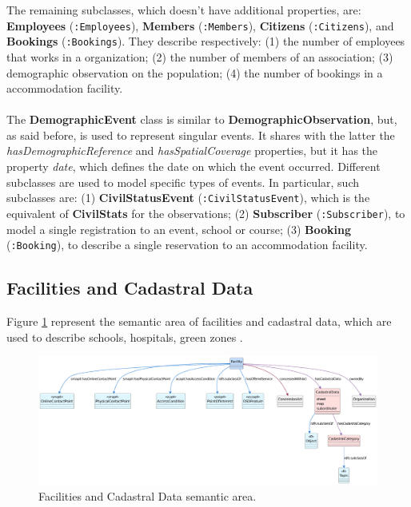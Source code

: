 The remaining subclasses, which doesn't have additional properties, are: \textbf{Employees} (\verb#:Employees#), \textbf{Members} (\verb#:Members#), \textbf{Citizens} (\verb#:Citizens#), and \textbf{Bookings} (\verb#:Bookings#). They describe respectively: (1) the number of employees that works in a organization; (2) the number of members of an association; (3) demographic observation on the population; (4) the number of bookings in a accommodation facility.

\paragraph*{}
The \textbf{DemographicEvent} class is similar to \textbf{DemographicObservation}, but, as said before, is used to represent singular events. It shares with the latter the \textit{hasDemographicReference} and \textit{hasSpatialCoverage} properties, but it has the property \textit{date}, which defines the date on which the event occurred. Different subclasses are used to model specific types of events. In particular, such subclasses are: (1) \textbf{CivilStatusEvent} (\verb#:CivilStatusEvent#), which is the equivalent of \textbf{CivilStats} for the observations; (2) \textbf{Subscriber} (\verb#:Subscriber#), to model a single registration to an event, school or course; (3) \textbf{Booking} (\verb#:Booking#), to describe a single reservation to an accommodation facility.

\subsection{Facilities and Cadastral Data}
\label{subsec:facilities}

Figure \ref{fig:facilities-sa} represent the semantic area of facilities and cadastral data, which are used to describe schools, hospitals, green zones \etc.

\begin{figure}[!ht]
  \centering
  \includegraphics[width=\columnwidth]{images/ontoim/facilities}
  \caption{Facilities and Cadastral Data semantic area.}
  \label{fig:facilities-sa}
\end{figure}

